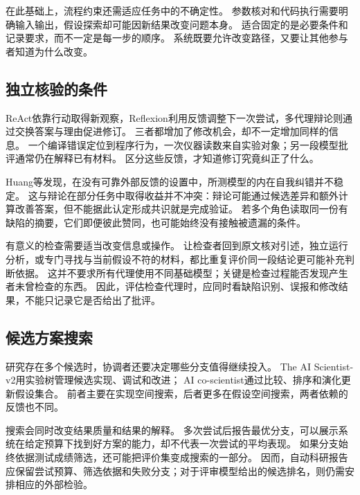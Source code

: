 在此基础上，流程约束还需适应任务中的不确定性。
参数核对和代码执行需要明确输入输出，假设探索却可能因新结果改变问题本身。
适合固定的是必要条件和记录要求，而不一定是每一步的顺序。
系统既要允许改变路径，又要让其他参与者知道为什么改变。

\subsection{独立核验的条件}
ReAct依靠行动取得新观察，Reflexion利用反馈调整下一次尝试，多代理辩论则通过交换答案与理由促进修订\cite{react,reflexion,debate}。
三者都增加了修改机会，却不一定增加同样的信息。
一个编译错误定位到程序行为，一次仪器读数来自实验对象；另一段模型批评通常仍在解释已有材料。
区分这些反馈，才知道修订究竟纠正了什么。

Huang等发现，在没有可靠外部反馈的设置中，所测模型的内在自我纠错并不稳定\cite{correct}。
这与辩论在部分任务中取得收益并不冲突：辩论可能通过候选差异和额外计算改善答案，但不能据此认定形成共识就是完成验证。
若多个角色读取同一份有缺陷的摘要，它们即便彼此赞同，也可能始终没有接触被遗漏的条件。

有意义的检查需要适当改变信息或操作。
让检查者回到原文核对引述，独立运行分析，或专门寻找与当前假设不符的材料，都比重复评价同一段结论更可能补充判断依据。
这并不要求所有代理使用不同基础模型；关键是检查过程能否发现产生者未曾检查的东西。
因此，评估检查代理时，应同时看缺陷识别、误报和修改结果，不能只记录它是否给出了批评。

\subsection{候选方案搜索}
研究存在多个候选时，协调者还要决定哪些分支值得继续投入。
The AI Scientist-v2用实验树管理候选实现、调试和改进\cite{scientistv2}；
AI co-scientist通过比较、排序和演化更新假设集合\cite{cosci}。
前者主要在实现空间搜索，后者更多在假设空间搜索，两者依赖的反馈也不同。

搜索会同时改变结果质量和结果的解释。
多次尝试后报告最优分支，可以展示系统在给定预算下找到好方案的能力，却不代表一次尝试的平均表现。
如果分支始终依据测试成绩筛选，还可能把评价集变成搜索的一部分。
因而，自动科研报告应保留尝试预算、筛选依据和失败分支；对于评审模型给出的候选排名，则仍需安排相应的外部检验。
